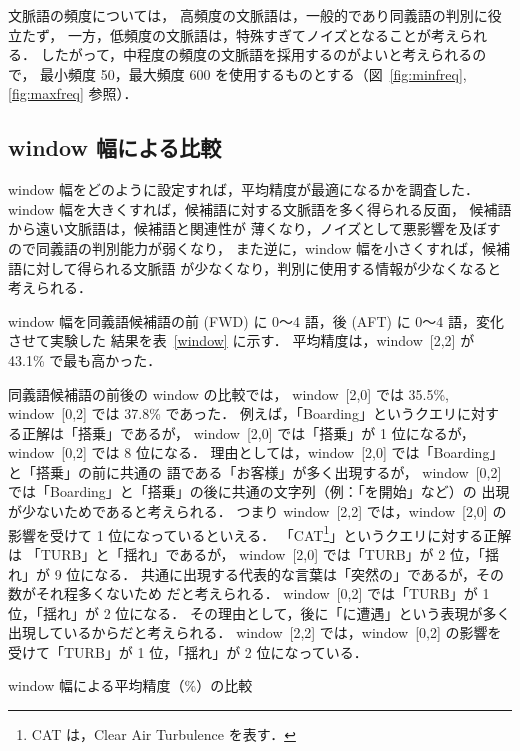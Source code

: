 \documentclass[japanese]{jnlp_1.4}
\begin{document}
文脈語の頻度については，
高頻度の文脈語は，一般的であり同義語の判別に役立たず，
一方，低頻度の文脈語は，特殊すぎてノイズとなることが考えられる．
したがって，中程度の頻度の文脈語を採用するのがよいと考えられるので，
最小頻度 50，最大頻度 600 を使用するものとする（図~\ref{fig:minfreq}, \ref{fig:maxfreq} 参照）．



\subsection{window 幅による比較}
\label{subsec:window幅による比較}

window 幅をどのように設定すれば，平均精度が最適になるかを調査した．
window 幅を大きくすれば，候補語に対する文脈語を多く得られる反面，
候補語から遠い文脈語は，候補語と関連性が
薄くなり，ノイズとして悪影響を及ぼすので同義語の判別能力が弱くなり，
また逆に，window 幅を小さくすれば，候補語に対して得られる文脈語
が少なくなり，判別に使用する情報が少なくなると考えられる．

window 幅を同義語候補語の前 (FWD) に 0〜4 語，後 (AFT) に 0〜4 語，変化させて実験した
結果を表~\ref{window} に示す．
平均精度は，window~[2,2] が 43.1\% で最も高かった．

同義語候補語の前後の window の比較では，
window~[2,0] では 35.5\%, window~[0,2] では 37.8\% であった．
例えば，「Boarding」というクエリに対する正解は「搭乗」であるが，
window~[2,0] では「搭乗」が 1 位になるが，window~[0,2] では 8 位になる．
理由としては，window~[2,0] では「Boarding」と「搭乗」の前に共通の
語である「お客様」が多く出現するが，
window~[0,2] では「Boarding」と「搭乗」の後に共通の文字列（例：「を開始」など）の
出現が少ないためであると考えられる．
つまり window~[2,2] では，window~[2,0] の影響を受けて 1 位になっているといえる．
「CAT\footnote{
	CAT は，Clear Air Turbulence を表す．
}」というクエリに対する正解は
「TURB」と「揺れ」であるが，
window~[2,0] では「TURB」が 2 位，「揺れ」が 9 位になる．
共通に出現する代表的な言葉は「突然の」であるが，その数がそれ程多くないため
だと考えられる．
window~[0,2] では「TURB」が 1 位，「揺れ」が 2 位になる．
その理由として，後に「に遭遇」という表現が多く出現しているからだと考えられる．
window~[2,2] では，window~[0,2] の影響を受けて「TURB」が 1 位，「揺れ」が 2 位になっている．

\begin{table}[t]
\begin{center}
\caption{window 幅による平均精度（\%）の比較}
\label{window}

\end{center}
\end{table}
\end{document}
